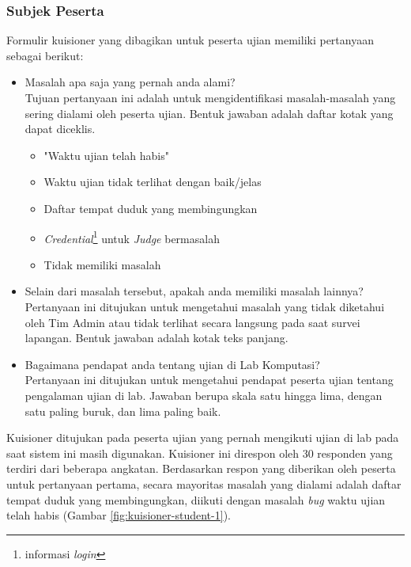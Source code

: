    \subsubsection{Subjek Peserta}
    Formulir kuisioner yang dibagikan untuk peserta ujian memiliki pertanyaan sebagai berikut:
    \begin{itemize}
        \item Masalah apa saja yang pernah anda alami?\\
            Tujuan pertanyaan ini adalah untuk mengidentifikasi masalah-masalah yang sering dialami oleh peserta ujian.
            Bentuk jawaban adalah daftar kotak yang dapat diceklis.
            \begin{itemize}
                \item "Waktu ujian telah habis"
                \item Waktu ujian tidak terlihat dengan baik/jelas
                \item Daftar tempat duduk yang membingungkan
                \item \textit{Credential}\footnote{informasi \textit{login}} untuk \textit{Judge} bermasalah
                \item Tidak memiliki masalah
            \end{itemize}
            
        \item Selain dari masalah tersebut, apakah anda memiliki masalah lainnya?\\
            Pertanyaan ini ditujukan untuk mengetahui masalah yang tidak diketahui oleh Tim Admin atau tidak terlihat secara langsung pada saat survei lapangan.
            Bentuk jawaban adalah kotak teks panjang.
            
        \item Bagaimana pendapat anda tentang ujian di Lab Komputasi?\\
            Pertanyaan ini ditujukan untuk mengetahui pendapat peserta ujian tentang pengalaman ujian di lab.
            Jawaban berupa skala satu hingga lima, dengan satu paling buruk, dan lima paling baik.
            
    \end{itemize}
    Kuisioner ditujukan pada peserta ujian yang pernah mengikuti ujian di lab pada saat sistem ini masih digunakan. Kuisioner ini direspon oleh 30 responden yang terdiri dari beberapa angkatan.
    Berdasarkan respon yang diberikan oleh peserta untuk pertanyaan pertama, secara mayoritas masalah yang dialami adalah daftar tempat duduk yang membingungkan, diikuti dengan masalah \textit{bug} waktu ujian telah habis (Gambar \ref{fig:kuisioner-student-1}).
